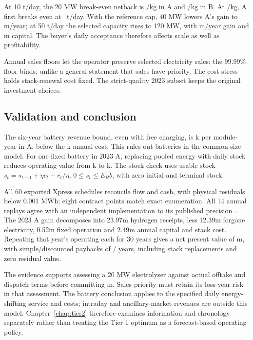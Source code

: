 At 10 t/day, the 20 MW break-even netback is \gbp\BreakA/kg in A and
\gbp\BreakB/kg in B. At \gbp\Netback/kg, A first breaks even at
\OfftakeBreak~t/day. With the reference cap, 40 MW lowers A's gain to
\gbp\FortyGain m/year; at 50 t/day the selected capacity rises to 120 MW,
with \gbp\ExpansionGain m/year gain and \gbp\ExpansionCapital m capital.
The buyer's daily acceptance therefore affects scale as well as profitability.


Annual sales floors let the operator preserve selected electricity sales;
the 99.99\% floor binds, unlike a general statement that sales have priority.
The cost stress holds stack-renewal cost fixed.
The strict-quality 2023 subset keeps the original investment choices.

\subsection{Validation and conclusion}
The six-year battery revenue bound, even with free charging, is
\gbp\BatteryBound k per module-year in A, below the \gbp\BatteryCost k
annual cost. This rules out batteries in the common-size model. For one
fixed battery in 2023 A, replacing pooled energy with daily stock reduces
operating value from \gbp\PoolValue k to \gbp\StockValue k. The stock check
uses usable stock \(s_t=s_{t-1}+\eta c_t-r_t/\eta\),
\(0\le s_t\le E_Bb\), with zero initial and terminal stock.

All 60 exported Xpress schedules reconcile flow and cash, with physical
residuals below 0.001 MWh; eight contract points match exact enumeration.
All 14 annual replays agree with an independent implementation to its
published precision \cite{peer}. The 2023 A gain decomposes into
\gbp 23.97m hydrogen receipts, less \gbp 12.39m forgone electricity,
\gbp 0.52m fixed operation and \gbp 2.49m annual capital and stack cost.
Repeating that year's operating cash for 30 years gives a net present value
of \gbp\NPV m,
with simple/discounted paybacks of \Payback/\DiscountedPayback{} years,
including stack replacements and zero residual value.

The evidence supports assessing a 20 MW electrolyser against actual offtake
and dispatch terms before committing \gbp\Capital m. Sales priority must
retain its loss-year risk in that assessment. The battery conclusion applies
to the specified daily energy-shifting service and costs; intraday and
ancillary-market revenues are outside this model. Chapter~\ref{chap:tier2}
therefore examines information and chronology separately rather than treating
the Tier 1 optimum as a forecast-based operating policy.

